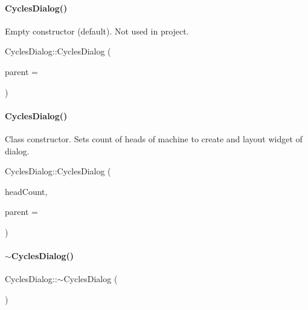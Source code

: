 \paragraph{\texorpdfstring{Cycles\+Dialog()}{CyclesDialog()}{\footnotesize\ttfamily [1/2]}}
Empty constructor (default). Not used in project.\\
{\footnotesize\ttfamily Cycles\+Dialog\+::\+Cycles\+Dialog (\begin{DoxyParamCaption}\item[{Q\+Widget $\ast$}]{parent = {} }\end{DoxyParamCaption}){\ttfamily [explicit]}}
\mbox{\label{classCyclesDialog_a3eeb8a5c3baba2d43c604981cb3eceaa}} 
\paragraph{\texorpdfstring{Cycles\+Dialog()}{CyclesDialog()}{\footnotesize\ttfamily [2/2]}}
Class constructor. Sets count of heads of machine to create and layout widget of dialog.\\
{\footnotesize\ttfamily Cycles\+Dialog\+::\+Cycles\+Dialog (\begin{DoxyParamCaption}\item[{int}]{head\+Count,  }\item[{Q\+Widget $\ast$}]{parent = {} }\end{DoxyParamCaption}){\ttfamily [explicit]}}

\mbox{\label{classCyclesDialog_ad4da02e07b34c1d7e4aaad3bffab2246}} 
\paragraph{\texorpdfstring{$\sim$\+Cycles\+Dialog()}{~CyclesDialog()}}
{\footnotesize\ttfamily Cycles\+Dialog\+::$\sim$\+Cycles\+Dialog (\begin{DoxyParamCaption}{ }\end{DoxyParamCaption})}

